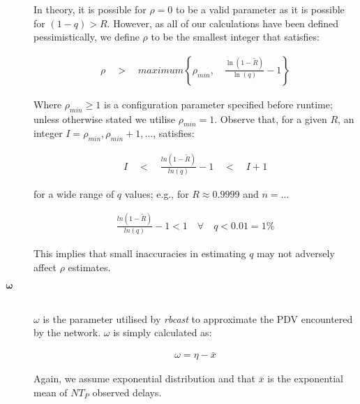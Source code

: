 \begin{description}
        In theory, it is possible for $\rho = 0$ to be a valid parameter as it is possible for $(1-q) > R$.  However, as all of our calculations have been defined pessimistically, we define $\rho$ to be the smallest integer that satisfies:
        
        \begin{equation}
            \begin{aligned}
                \rho \quad > \quad maximum \left\{\rho_{min}, \quad \frac{\ln\left(1 - \tilde{R}\right)}{\ln(q)} - 1 \right\}
            \end{aligned}
        \end{equation}
        
        Where $\rho_{min} \geq 1$ is a configuration parameter specified before runtime; unless otherwise stated we utilise $\rho_{min} = 1$.  Observe that, for a given $R$, an integer $I =\rho_{min}, \rho_{min} + 1, \ldots$, satisfies: 

        \begin{equation}
            \begin{aligned}
                I \quad < \quad  \frac{ln \left(1 - \tilde{R}\right)}{ln(q)} - 1 \quad < \quad I + 1
            \end{aligned}
        \end{equation}
        
        for a wide range of $q$ values; e.g., for $R \approx 0.9999$ and $n = \ldots$

        \begin{equation}
            \begin{aligned}
                \frac{ln(1- \tilde{R})}{ln(q)}-1 < 1 \quad \forall \quad q < 0.01 = 1\%
            \end{aligned}
        \end{equation}

        This implies that small inaccuracies in estimating $q$ may not adversely affect $\rho$ estimates.  

        \item[\Huge$\boldsymbol{\omega}$] \hfill \\
        $\omega$ is the parameter utilised by \emph{rbcast} to approximate the PDV encountered by the network.  $\omega$ is simply calculated as:
        
        \begin{equation}
            \begin{aligned}
                \omega = \eta - \bar{x}
            \end{aligned}
        \end{equation}        
        
        Again, we assume exponential distribution and that $\bar{x}$ is the exponential mean of $NT_P$ observed delays.
        \end{description}

